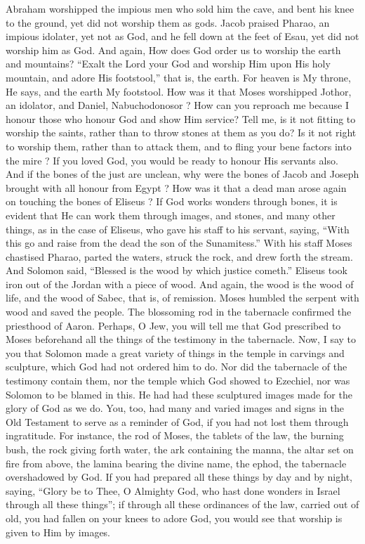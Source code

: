 \documentclass[10pt]{book}
\newcommand{\switchenglish}{\selectlanguage{english} \switchcolumn}
\begin{document}
\begin{paracol}{2}
\switchenglish

Abraham worshipped the impious men who 
sold him the cave, and bent his knee to the 
ground, yet did not worship them as gods. 
Jacob praised Pharao, an impious idolater, yet 
not as God, and he fell down at the feet of 
Esau, yet did not worship him as God. And 
again, How does God order us to worship 
the earth and mountains? ``Exalt the Lord 
your God and worship Him upon His holy 
mountain, and adore His footstool,'' that is, 
the earth. For heaven is My throne, He 
says, and the earth My footstool. How was 
it that Moses worshipped Jothor, an idolator, 
and Daniel, Nabuchodonosor ? How can you 
reproach me because I honour those who 
honour God and show Him service? Tell 
me, is it not fitting to worship the saints, 
rather than to throw stones at them as you 
do? Is it not right to worship them, rather 
than to attack them, and to fling your bene 
factors into the mire ? If you loved God, 
you would be ready to honour His servants 
also. And if the bones of the just are 
unclean, why were the bones of Jacob and 
Joseph brought with all honour from Egypt ? 
How was it that a dead man arose again on 
touching the bones of Eliseus ? If God works 
wonders through bones, it is evident that He 
can work them through images, and stones, 
and many other things, as in the case of 
Eliseus, who gave his staff to his servant, 
saying, ``With this go and raise from the dead 
the son of the Sunamitess.'' With his staff 
Moses chastised Pharao, parted the waters, 
struck the rock, and drew forth the stream. 
And Solomon said, ``Blessed is the wood by 
which justice cometh.'' Eliseus took iron out 
of the Jordan with a piece of wood. And 
again, the wood is the wood of life, and the 
wood of Sabec, that is, of remission. Moses 
humbled the serpent with wood and saved the 
people. The blossoming rod in the tabernacle 
confirmed the priesthood of Aaron. Perhaps, 
O Jew, you will tell me that God prescribed 
to Moses beforehand all the things of the 
testimony in the tabernacle. Now, I say to 
you that Solomon made a great variety of 
things in the temple in carvings and sculpture, 
which God had not ordered him to do. Nor 
did the tabernacle of the testimony contain 
them, nor the temple which God showed to 
Ezechiel, nor was Solomon to be blamed in 
this. He had had these sculptured images 
made for the glory of God as we do. You, 
too, had many and varied images and signs 
in the Old Testament to serve as a reminder 
of God, if you had not lost them through 
ingratitude. For instance, the rod of Moses, 
the tablets of the law, the burning bush, the 
rock giving forth water, the ark containing 
the manna, the altar set on fire from above,
the lamina bearing the divine 
name, the ephod, the tabernacle overshadowed 
by God. If you had prepared all these things 
by day and by night, saying, ``Glory be to 
Thee, O Almighty God, who hast done 
wonders in Israel through all these things''; 
if through all these ordinances of the law, 
carried out of old, you had fallen on your 
knees to adore God, you would see that 
worship is given to Him by images. 


\end{paracol}
\end{document}
